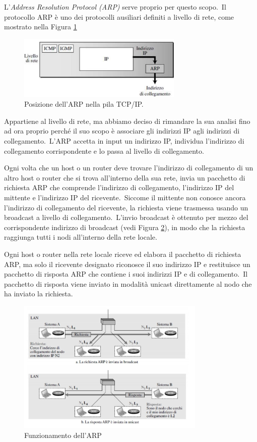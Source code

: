 L'\emph{Address Resolution Protocol (ARP)} serve proprio per questo scopo.\
Il protocollo ARP è uno dei protocolli ausiliari definiti a livello di rete, come mostrato nella Figura \ref{fig:ARP}

\begin{figure}[H]
    \centering
    \includegraphics[width=0.7\textwidth]{immagini/ARP.jpg}
    \caption{Posizione dell'ARP nella pila TCP/IP.}
    \label{fig:ARP}
\end{figure}

Appartiene al livello di rete, ma abbiamo deciso di rimandare la sua analisi fino ad ora proprio perché il suo scopo è associare gli indirizzi IP agli indirizzi di collegamento.\
L'ARP accetta in input un indirizzo IP, individua l'indirizzo di collegamento corrispondente e lo passa al livello di collegamento.

Ogni volta che un host o un router deve trovare l'indirizzo di collegamento di un altro host o router che si trova all'interno della sua rete, invia un pacchetto di richiesta ARP che comprende l'indirizzo di collegamento, l'indirizzo IP del mittente e l'indirizzo IP del ricevente.\
Siccome il mittente non conosce ancora l'indirizzo di collegamento del ricevente, la richiesta viene trasmessa usando un broadcast a livello di collegamento.\
L'invio broadcast è ottenuto per mezzo del corrispondente indirizzo di broadcast (vedi Figura \ref{fig:Funzionamento}), in modo che la richiesta raggiunga tutti i nodi all'interno della rete locale.

Ogni host o router nella rete locale riceve ed elabora il pacchetto di richiesta ARP, ma solo il ricevente designato riconosce il suo indirizzo IP e restituisce un pacchetto di risposta ARP che contiene i suoi indirizzi IP e di collegamento.\
Il pacchetto di risposta viene inviato in modalità unicast direttamente al nodo che ha inviato la richiesta.

\begin{figure}[H]
    \centering
    \includegraphics[width=0.8\textwidth]{immagini/ARP_funzionamento.jpg}
    \caption{Funzionamento dell'ARP}
    \label{fig:Funzionamento}
\end{figure}


